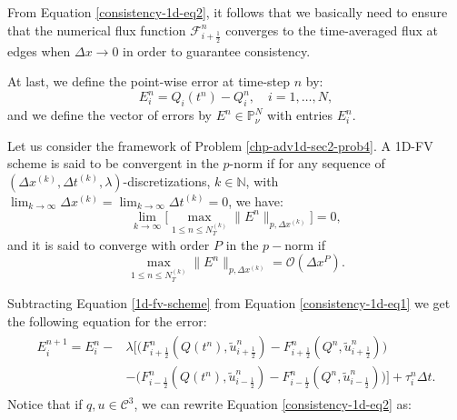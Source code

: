 From Equation \eqref{consistency-1d-eq2}, it follows that we basically need to ensure that 
the numerical flux function $\mathcal{F}^n_{i+\frac{1}{2}}$ converges to the time-averaged flux at edges
when $\Delta x \to 0$ in order to guarantee consistency.

At last, we define the point-wise error at time-step $n$ by:
\begin{equation*}
	E_i^n = Q_i(t^n) - Q_i^n, \quad i=1, \ldots, N,
\end{equation*}
and we define the vector of errors by $E^n \in \mathbb{P}^{N}_{\nu}$ with entries $E_i^n$.
\begin{definition}[Convergence]
	\label{chp-adv1d-def-conv}
	Let us consider the framework of Problem \ref{chp-adv1d-sec2-prob4}.
	A 1D-FV scheme is said to be convergent in the $p$-norm if for any sequence of $(\Delta x^{(k)}, \Delta t^{(k)},\lambda)$-discretizations, 
	$k \in \mathbb{N}$, with $\lim_{k\to \infty }{\Delta x^{(k)}} = \lim_{k\to \infty }{\Delta t^{(k)}} = 0$, we have:
	\begin{equation*}
		\lim_{k\to \infty}\bigg[ {\max_{1\leq n\leq N_T^{(k)}}}{\|E^n\|_{p,\Delta x^{(k)}}} \bigg] = 0,
	\end{equation*}
	and it is said to converge with order $P$ in the $p-$norm if
	\begin{equation*}
		{\max_{1\leq n\leq N_T^{(k)}}}{\|E^n\|_{p,\Delta x^{(k)}}} = \mathcal{O}(\Delta x^P).
	\end{equation*}
\end{definition}
Subtracting Equation \eqref{1d-fv-scheme} from Equation \eqref{consistency-1d-eq1} we get
the following equation for the error:
\begin{align}
	\begin{split}
		\label{erroreq-1d-eq2}
		E^{n+1}_i = E^n_i -
		&\lambda
		\bigg[
		\bigg( {F}^n_{i+\frac{1}{2}}(Q(t^n),\tilde{u}^n_{i+\frac{1}{2}}) - {F}^n_{i+\frac{1}{2}}(Q^n,\tilde{u}^n_{i+\frac{1}{2}}) \bigg) \\
		&-\bigg( {F}^n_{i-\frac{1}{2}}(Q(t^n),\tilde{u}^n_{i-\frac{1}{2}}) - {F}^n_{i-\frac{1}{2}}(Q^n,\tilde{u}^n_{i-\frac{1}{2}}) \bigg)
		\bigg] 
		+ \tau_{i}^n \Delta t .
	\end{split}
\end{align}
Notice that if $q,u \in \mathcal{C}^3$, we can rewrite Equation \eqref{consistency-1d-eq2} as:
